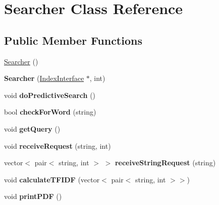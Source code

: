 \hypertarget{classSearcher}{}\section{Searcher Class Reference}
\label{classSearcher}
\subsection*{Public Member Functions}
\begin{DoxyCompactItemize}
\item 
\hyperlink{classSearcher_a46e9a9fa3aad21131cf6bd25237e3a80}{Searcher} ()
\item 
{\bfseries Searcher} (\hyperlink{classIndexInterface}{Index\+Interface} $\ast$, int)\hypertarget{classSearcher_a157bbe5f4f571b72fc68aff88f59b9cd}{}\label{classSearcher_a157bbe5f4f571b72fc68aff88f59b9cd}

\item 
void {\bfseries do\+Predictive\+Search} ()\hypertarget{classSearcher_a2772c478dc88e43a3b84551f70ef29e9}{}\label{classSearcher_a2772c478dc88e43a3b84551f70ef29e9}

\item 
bool {\bfseries check\+For\+Word} (string)\hypertarget{classSearcher_aa5f6fefa11ffe4be889543e34c9d6951}{}\label{classSearcher_aa5f6fefa11ffe4be889543e34c9d6951}

\item 
void {\bfseries get\+Query} ()\hypertarget{classSearcher_ae2636d7a5c4848ec3e4db157d8bb4db0}{}\label{classSearcher_ae2636d7a5c4848ec3e4db157d8bb4db0}

\item 
void {\bfseries receive\+Request} (string, int)\hypertarget{classSearcher_a3f1b9fcc0f8171b1c0d25939dd8e989e}{}\label{classSearcher_a3f1b9fcc0f8171b1c0d25939dd8e989e}

\item 
vector$<$ pair$<$ string, int $>$ $>$ {\bfseries receive\+String\+Request} (string)\hypertarget{classSearcher_ad0e033ca4f8d631de668292742204a38}{}\label{classSearcher_ad0e033ca4f8d631de668292742204a38}

\item 
void {\bfseries calculate\+T\+F\+I\+DF} (vector$<$ pair$<$ string, int $>$$>$)\hypertarget{classSearcher_abd4283ad2c5d4abd76493decc5a67809}{}\label{classSearcher_abd4283ad2c5d4abd76493decc5a67809}

\item 
void {\bfseries print\+P\+DF} ()\hypertarget{classSearcher_a87f66f0030cac0f73d90093c563800ce}{}\label{classSearcher_a87f66f0030cac0f73d90093c563800ce}


\end{DoxyCompactItemize}
